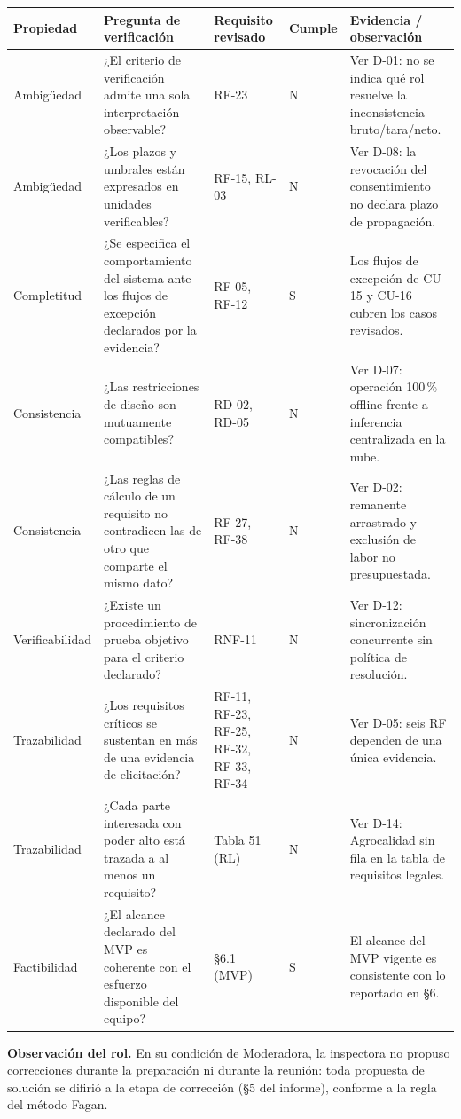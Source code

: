 \documentclass[11pt,letterpaper]{article}
\newcommand{\cabecera}{%
\rowcolor{gris}\textbf{Propiedad} & \textbf{Pregunta de verificación} & \textbf{Requisito revisado} & \textbf{Cumple} & \textbf{Evidencia / observación}\\}
\begin{document}
\begin{center}\footnotesize
\begin{tabularx}{\textwidth}{P{2.0cm} X P{2.5cm} C{1.2cm} P{3.2cm}}
\toprule
\cabecera
\midrule
Ambigüedad & ¿El criterio de verificación admite una sola interpretación observable? & RF-23 & N & Ver D-01: no se indica qué rol resuelve la inconsistencia bruto/tara/neto.\\
Ambigüedad & ¿Los plazos y umbrales están expresados en unidades verificables? & RF-15, RL-03 & N & Ver D-08: la revocación del consentimiento no declara plazo de propagación.\\
Completitud & ¿Se especifica el comportamiento del sistema ante los flujos de excepción declarados por la evidencia? & RF-05, RF-12 & S & Los flujos de excepción de CU-15 y CU-16 cubren los casos revisados.\\
Consistencia & ¿Las restricciones de diseño son mutuamente compatibles? & RD-02, RD-05 & N & Ver D-07: operación 100\,\% offline frente a inferencia centralizada en la nube.\\
Consistencia & ¿Las reglas de cálculo de un requisito no contradicen las de otro que comparte el mismo dato? & RF-27, RF-38 & N & Ver D-02: remanente arrastrado y exclusión de labor no presupuestada.\\
Verificabilidad & ¿Existe un procedimiento de prueba objetivo para el criterio declarado? & RNF-11 & N & Ver D-12: sincronización concurrente sin política de resolución.\\
Trazabilidad & ¿Los requisitos críticos se sustentan en más de una evidencia de elicitación? & RF-11, RF-23, RF-25, RF-32, RF-33, RF-34 & N & Ver D-05: seis RF dependen de una única evidencia.\\
Trazabilidad & ¿Cada parte interesada con poder alto está trazada a al menos un requisito? & Tabla 51 (RL) & N & Ver D-14: Agrocalidad sin fila en la tabla de requisitos legales.\\
Factibilidad & ¿El alcance declarado del MVP es coherente con el esfuerzo disponible del equipo? & §6.1 (MVP) & S & El alcance del MVP vigente es consistente con lo reportado en §6.\\
\bottomrule
\end{tabularx}
\end{center}

\small \textbf{Observación del rol.} En su condición de Moderadora, la inspectora no propuso
correcciones durante la preparación ni durante la reunión: toda propuesta de solución se
difirió a la etapa de corrección (§5 del informe), conforme a la regla del método Fagan.
\normalsize
\end{document}

